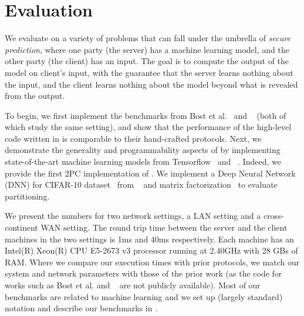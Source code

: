 \vspace{-0.2in}
\section{Evaluation}
\label{sec:eval}
We evaluate \tool on a variety of problems that can fall under the umbrella of {\it secure prediction}, where one
party (the server) has a machine learning model, and the other party
(the client) has an input. The goal is to compute the output of the
model on client's input, with the guarantee that the server
learns nothing about the input, and the client learns nothing
about the model beyond what is revealed from the output.

To begin, we first implement the benchmarks from Bost et al.~\cite{shafindss}
and \minion~\cite{minionn} (both of which study the same setting),
and show that the performance of the high-level code written in \tool
is comparable to their hand-crafted protocols.
%
Next, we demonstrate the generality and programmability aspects of
\tool by implementing state-of-the-art machine learning models from
Tensorflow~\cite{tensorflow} and \bonsai~\cite{bonsai}. Indeed, we
provide the first 2PC implementation of \bonsai.
%
We
implement a Deep Neural Network (DNN) for CIFAR-10
dataset~\cite{cifar} from \minion~\cite{minionn} and matrix factorization~\cite{valeriaMatrix}
to evaluate partitioning.

We present the numbers for two network settings, a LAN setting and
a cross-continent WAN setting. The round trip time between the server
and the client machines in the two settings is 1ms and 40ms respectively. Each
machine has an Intel(R) Xeon(R) CPU E5-2673 v3 processor running at
2.40GHz with 28 GBs of RAM. Where we compare our execution times with prior protocols, we match our system and network parameters with those of the prior work (as the code for works such as Bost et al. \cite{shafindss} and \minion~\cite{minionn} are not publicly available).
%
Most of our benchmarks
are related to machine learning and we set up (largely standard) notation and describe our benchmarks in .

